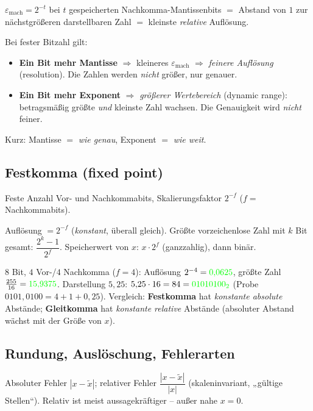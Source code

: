 \documentclass[a4paper,11pt]{article}
\newcommand{\f}[1]{\textcolor{green}{#1}}
\begin{document}
\begin{formel}[Maschinenepsilon]
$\varepsilon_{\mathrm{mach}}=2^{-t}$ bei $t$ gespeicherten Nachkomma-Mantissenbits $=$ Abstand von
$1$ zur nächstgrößeren darstellbaren Zahl $=$ kleinste \emph{relative} Auflösung.
\end{formel}

\begin{merke}
Bei fester Bitzahl gilt:
\begin{itemize}[leftmargin=1.4em,nosep]
\item \textbf{Ein Bit mehr Mantisse} $\Rightarrow$ kleineres $\varepsilon_{\mathrm{mach}}$ $\Rightarrow$
      \emph{feinere Auflösung} (resolution). Die Zahlen werden \emph{nicht} größer, nur genauer.
\item \textbf{Ein Bit mehr Exponent} $\Rightarrow$ \emph{größerer Wertebereich} (dynamic range):
      betragsmäßig größte \emph{und} kleinste Zahl wachsen. Die Genauigkeit wird \emph{nicht} feiner.
\end{itemize}
Kurz: Mantisse $=$ \emph{wie genau}, Exponent $=$ \emph{wie weit}.
\end{merke}

\subsection{Festkomma (fixed point)}
Feste Anzahl Vor- und Nachkommabits, Skalierungsfaktor $2^{-f}$ ($f=$ Nachkommabits).
\begin{formel}[Festkomma]
Auflösung $=2^{-f}$ (\emph{konstant}, überall gleich). Größte vorzeichenlose Zahl mit $k$ Bit gesamt:
$\dfrac{2^{k}-1}{2^{f}}$. Speicherwert von $x$: $x\cdot 2^{f}$ (ganzzahlig), dann binär.
\end{formel}
\begin{beispiel}
$8$ Bit, $4$ Vor-/$4$ Nachkomma ($f=4$): Auflösung $2^{-4}=\f{0{,}0625}$, größte Zahl
$\tfrac{255}{16}=\f{15{,}9375}$. Darstellung $5{,}25$: $5{,}25\cdot16=84=\f{01010100_2}$
(Probe $0101{,}0100=4+1+0{,}25$). \;
Vergleich: \textbf{Festkomma} hat \emph{konstante absolute} Abstände; \textbf{Gleitkomma} hat
\emph{konstante relative} Abstände (absoluter Abstand wächst mit der Größe von $x$).
\end{beispiel}

\subsection{Rundung, Auslöschung, Fehlerarten}
\begin{formel}[Fehlermaße]
Absoluter Fehler $|x-\tilde x|$; relativer Fehler $\dfrac{|x-\tilde x|}{|x|}$ (skaleninvariant, „gültige
Stellen``). Relativ ist meist aussagekräftiger -- außer nahe $x=0$.
\end{formel}
\end{document}
